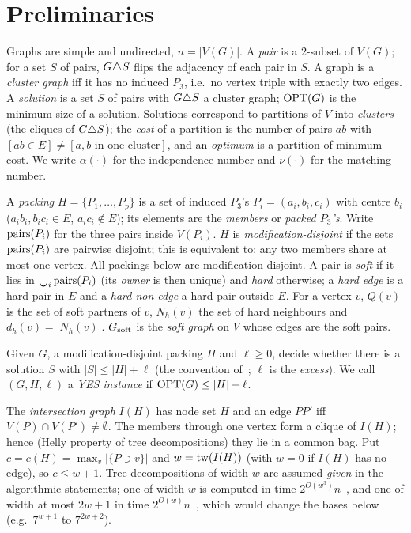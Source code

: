 \section{Preliminaries}\label{sec:prelim}
Graphs are simple and undirected, $n=|V(G)|$. A \emph{pair} is a $2$-subset of $V(G)$; for a set $S$ of pairs, $G\triangle S$ flips the adjacency of each pair in $S$. A graph is a \emph{cluster graph} iff it has no induced $P_3$, i.e.\ no vertex triple with exactly two edges. A \emph{solution} is a set $S$ of pairs with $G\triangle S$ a cluster graph; $\mathrm{OPT}(G)$ is the minimum size of a solution. Solutions correspond to partitions of $V$ into \emph{clusters} (the cliques of $G\triangle S$); the \emph{cost} of a partition is the number of pairs $ab$ with $[ab\in E]\ne[a,b\text{ in one cluster}]$, and an \emph{optimum} is a partition of minimum cost. We write $\alpha(\cdot)$ for the independence number and $\nu(\cdot)$ for the matching number.

A \emph{packing} $H=\{P_1,\dots,P_p\}$ is a set of induced $P_3$'s $P_i=(a_i,b_i,c_i)$ with centre $b_i$ ($a_ib_i,b_ic_i\in E$, $a_ic_i\notin E$); its elements are the \emph{members} or \emph{packed $P_3$'s}. Write $\mathrm{pairs}(P_i)$ for the three pairs inside $V(P_i)$. $H$ is \emph{modification-disjoint} if the sets $\mathrm{pairs}(P_i)$ are pairwise disjoint; this is equivalent to: any two members share at most one vertex. All packings below are modification-disjoint. A pair is \emph{soft} if it lies in $\bigcup_i\mathrm{pairs}(P_i)$ (its \emph{owner} is then unique) and \emph{hard} otherwise; a \emph{hard edge} is a hard pair in $E$ and a \emph{hard non-edge} a hard pair outside $E$. For a vertex $v$, $Q(v)$ is the set of soft partners of $v$, $N_h(v)$ the set of hard neighbours and $d_h(v)=|N_h(v)|$. $G_{\mathrm{soft}}$ is the \emph{soft graph} on $V$ whose edges are the soft pairs.

Given $G$, a modification-disjoint packing $H$ and $\ell\ge 0$, decide whether there is a solution $S$ with $|S|\le |H|+\ell$ (the convention of~\cite{LPS23}; $\ell$ is the \emph{excess}). We call $(G,H,\ell)$ a \emph{YES instance} if $\mathrm{OPT}(G)\le|H|+\ell$.

The \emph{intersection graph} $I(H)$ has node set $H$ and an edge $PP'$ iff $V(P)\cap V(P')\ne\emptyset$. The members through one vertex form a clique of $I(H)$; hence (Helly property of tree decompositions) they lie in a common bag. Put $c=c(H)=\max_v|\{P\ni v\}|$ and $w=\mathrm{tw}(I(H))$ (with $w=0$ if $I(H)$ has no edge), so $c\le w+1$. Tree decompositions of width $w$ are assumed \emph{given} in the algorithmic statements; one of width $w$ is computed in time $2^{O(w^3)}n$~\cite{Bod96,Cygan15}, and one of width at most $2w+1$ in time $2^{O(w)}n$~\cite{Kor21}, which would change the bases below (e.g.\ $7^{w+1}$ to $7^{2w+2}$).

